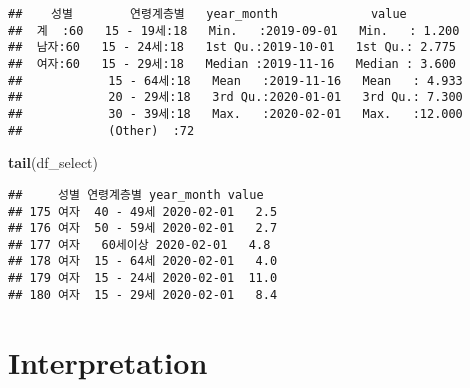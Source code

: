 \documentclass[]{article}
\newenvironment{Shaded}{\begin{snugshade}}{\end{snugshade}}
\newcommand{\DecValTok}[1]{\textcolor[rgb]{0.00,0.00,0.81}{#1}}
\newcommand{\KeywordTok}[1]{\textcolor[rgb]{0.13,0.29,0.53}{\textbf{#1}}}
\newcommand{\NormalTok}[1]{#1}
\newcommand{\OperatorTok}[1]{\textcolor[rgb]{0.81,0.36,0.00}{\textbf{#1}}}
\newcommand{\StringTok}[1]{\textcolor[rgb]{0.31,0.60,0.02}{#1}}
\begin{document}
\begin{verbatim}
##    성별        연령계층별   year_month             value       
##  계  :60   15 - 19세:18   Min.   :2019-09-01   Min.   : 1.200  
##  남자:60   15 - 24세:18   1st Qu.:2019-10-01   1st Qu.: 2.775  
##  여자:60   15 - 29세:18   Median :2019-11-16   Median : 3.600  
##            15 - 64세:18   Mean   :2019-11-16   Mean   : 4.933  
##            20 - 29세:18   3rd Qu.:2020-01-01   3rd Qu.: 7.300  
##            30 - 39세:18   Max.   :2020-02-01   Max.   :12.000  
##            (Other)  :72
\end{verbatim}

\begin{Shaded}
\begin{Highlighting}[]
\KeywordTok{tail}\NormalTok{(df_select)}
\end{Highlighting}
\end{Shaded}

\begin{verbatim}
##     성별 연령계층별 year_month value
## 175 여자  40 - 49세 2020-02-01   2.5
## 176 여자  50 - 59세 2020-02-01   2.7
## 177 여자   60세이상 2020-02-01   4.8
## 178 여자  15 - 64세 2020-02-01   4.0
## 179 여자  15 - 24세 2020-02-01  11.0
## 180 여자  15 - 29세 2020-02-01   8.4
\end{verbatim}

\hypertarget{interpretation}{%
\section{Interpretation}\label{interpretation}}

\begin{Shaded}
\end{Shaded}
\end{document}
